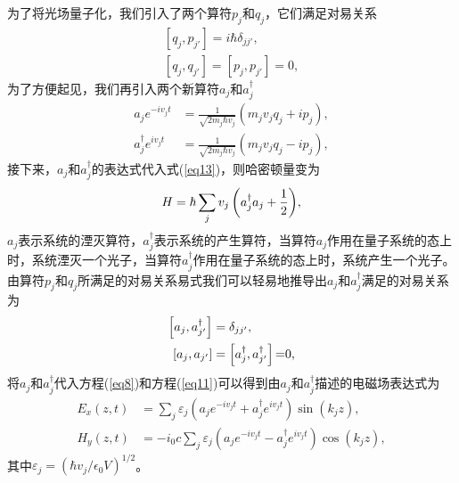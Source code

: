 为了将光场量子化，我们引入了两个算符$p_j$和$q_j$，它们满足对易关系
\begin{align}
\left[ {{q_j},{p_{j'}}} \right] = i\hbar {\delta _{jj'}},\label{eq14}\\
\left[ {{q_j},{q_{j'}}} \right] = \left[ {{p_j},{p_{j'}}} \right] = 0,\label{eq15}
\end{align}
为了方便起见，我们再引入两个新算符$a_j$和$a_j^\dagger$
\begin{align}
{a_j}{e^{ - i{v_j}t}}& = \frac{1}{{\sqrt {2{m_j}\hbar {v_j}} }}\left( {{m_j}{v_j}{q_j} + i{p_j}} \right),\label{eq16}\\
a_j^\dag {e^{i{v_j}t}}& = \frac{1}{{\sqrt {2{m_j}\hbar {v_j}} }}\left( {{m_j}{v_j}{q_j} - i{p_j}} \right),\label{eq17}
\end{align}
接下来，$a_j$和$a_j^\dagger$的表达式代入式(\ref{eq13})，则哈密顿量变为
\begin{align}
H = \hbar {\rm{ }}\sum\limits_j {{v_j}\left( {a_j^\dag {a_j} + \frac{1}{2}} \right)} ,\label{eq18}
\end{align}
$a_j$表示系统的湮灭算符，$a_j^\dagger$表示系统的产生算符，当算符$a_j$作用在量子系统的态上时，系统湮灭一个光子，当算符$a_j^\dagger$作用在量子系统的态上时，系统产生一个光子。由算符$p_j$和$q_j$所满足的对易关系易式我们可以轻易地推导出$a_j$和$a_j^\dagger$满足的对易关系为
\begin{align}
\left[ {{a_j},a_{j'}^\dag } \right]& = {\delta _{jj'}},\label{eq19}\\
\left[ {{a_j},{a_{j'}}} \right] &= \left[ {a_{j}^\dag ,a_{j'}^\dag } \right]{\rm{ = }}0,\label{eq20}
\end{align}
将$a_j$和$a_j^\dagger$代入方程(\ref{eq8})和方程(\ref{eq11})可以得到由$a_j$和$a_j^\dagger$描述的电磁场表达式为
\begin{align}
{E_x}\left( {z,t} \right) &= \sum\limits_j {{\varepsilon _j}\left( {{a_j}{e^{ - i{v_j}t}} + a_j^\dag {e^{i{v_j}t}}} \right)\sin \left( {{k_j}z} \right)} ,\label{eq21}\\
{H_y}\left( {z,t} \right) &=  - i{_0}c\sum\limits_j {{\varepsilon _j}\left( {{a_j}{e^{ - i{v_j}t}} - a_j^\dag {e^{i{v_j}t}}} \right)\cos \left( {{k_j}z} \right)} ,\label{eq22}
\end{align}
其中${\varepsilon _j} = \left( \hbar v_j /\epsilon_0 V\right)^{1/2}$。

